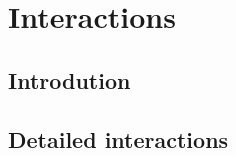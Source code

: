 \newpage
\thispagestyle{empty}
\chapter{Interactions}

\section{Introdution}

\section{Detailed interactions}